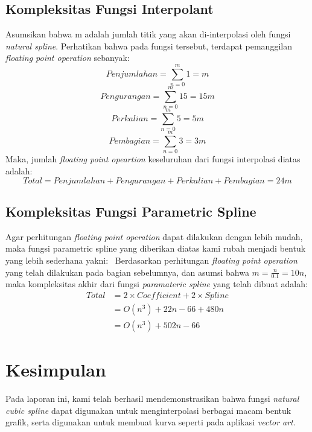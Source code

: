 \documentclass[journal,12pt,onecolumn,a4paper]{IEEEtran}
\begin{document}
\subsection{Kompleksitas Fungsi Interpolant}

Asumsikan bahwa m adalah jumlah titik yang akan di-interpolasi oleh fungsi \emph{natural spline}. Perhatikan bahwa pada fungsi tersebut, terdapat pemanggilan \emph{floating point operation} sebanyak:
\begin{equation}
	Penjumlahan = \sum_{n=0}^{m} 1 = m
\end{equation}
\begin{equation}
	Pengurangan = \sum_{n=0}^{m} 15 = 15m
\end{equation}
\begin{equation}
	Perkalian = \sum_{n=0}^{m} 5 = 5m
\end{equation}
\begin{equation}
	Pembagian = \sum_{n=0}^{m} 3 = 3m
\end{equation}
Maka, jumlah \emph{floating point opeartion} keseluruhan dari fungsi interpolasi diatas adalah:
\begin{equation}
	Total = Penjumlahan + Pengurangan + Perkalian + Pembagian = 24m
\end{equation}

\subsection{Kompleksitas Fungsi Parametric Spline}
Agar perhitungan \emph{floating point operation} dapat dilakukan dengan lebih mudah, maka fungsi parametric spline yang diberikan diatas kami rubah menjadi bentuk yang lebih sederhana yakni:
\
Berdasarkan perhitungan \emph{floating point operation} yang telah dilakukan pada bagian sebelumnya, dan asumsi bahwa \(m = \frac{n}{0.1} = 10n\), maka kompleksitas akhir dari fungsi \emph{paramateric spline} yang telah dibuat adalah:
\begin{equation}
	\begin{split}
		Total & = 2 \times Coefficient + 2 \times Spline\\
		& = O(n^3) + 22n - 66 + 480n\\
		& = O(n^3) + 502n - 66
	\end{split}
\end{equation}
\pagebreak
\section{Kesimpulan}
Pada laporan ini, kami telah berhasil mendemonstrasikan bahwa fungsi \emph{natural cubic spline} dapat digunakan untuk menginterpolasi berbagai macam bentuk grafik, serta digunakan untuk membuat kurva seperti pada aplikasi \emph{vector art}.
\end{document}
